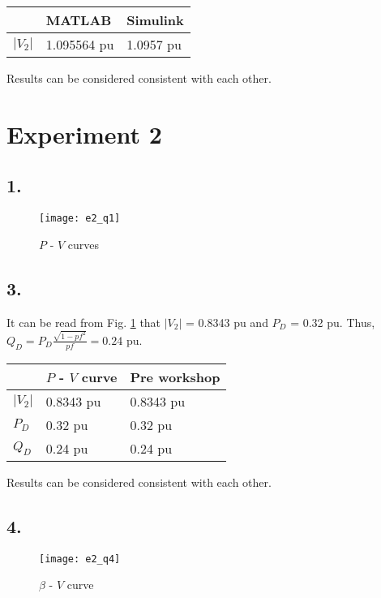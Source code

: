 \documentclass{article}
\begin{document}
\begin{tabu} to \textwidth {XXX}
\toprule
&MATLAB &Simulink\\
\hline
$|V_2|$ &1.095564 pu &1.0957 pu\\
\bottomrule
\end{tabu}

\vspace{9pt}
Results can be considered consistent with each other.


\section*{Experiment 2}

\subsection*{1.}
\begin{figure}[H]
\centering
\texttt{[image: e2\_q1]}
\caption{$P$ - $V$ curves}
\label{e2_q1}
\end{figure}

\subsection*{3.}
It can be read from Fig. \ref{e2_q1} that $|V_2|$ = 0.8343 pu and $P_D$ = 0.32 pu. Thus, $Q_D = P_D \frac{\sqrt{1 - pf^2}}{pf} = 0.24$ pu.

\begin{tabu} to \textwidth {XXX}
\toprule
&$P$ - $V$ curve &Pre workshop\\
\hline
$|V_2|$ &0.8343 pu &0.8343 pu\\
\hline
$P_D$ &0.32 pu &0.32 pu\\
\hline
$Q_D$ &0.24 pu &0.24 pu\\
\bottomrule
\end{tabu}

\vspace{9pt}
Results can be considered consistent with each other.

\subsection*{4.}
\begin{figure}[H]
\centering
\texttt{[image: e2\_q4]}
\caption{$\beta$ - $V$ curve}
\end{figure}
\end{document}
